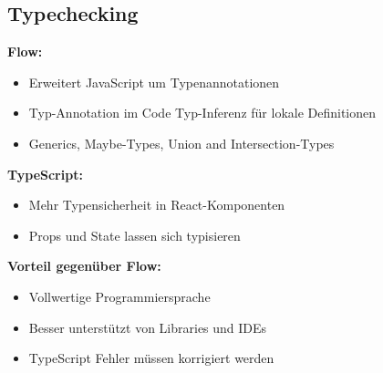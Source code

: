 \subsection{Typechecking}
\textcolor{b}{\textbf{Flow:}}
\begin{itemize}[topsep=0pt, leftmargin=3mm]
  \setlength\itemsep{-0.3em}
  \item Erweitert JavaScript um Typenannotationen
  \item Typ-Annotation im Code Typ-Inferenz für lokale Definitionen
  \item Generics, Maybe-Types, Union and Intersection-Types
\end{itemize}
\textcolor{b}{\textbf{TypeScript:}}
\begin{itemize}[topsep=0pt, leftmargin=3mm]
  \setlength\itemsep{-0.3em}
  \item Mehr Typensicherheit in React-Komponenten
  \item Props und State lassen sich typisieren
\end{itemize}
\textcolor{b}{\textbf{Vorteil gegenüber Flow:}}
\begin{itemize}[topsep=0pt, leftmargin=3mm]
  \setlength\itemsep{-0.3em}
  \item Vollwertige Programmiersprache
  \item Besser unterstützt von Libraries und IDEs
  \item TypeScript Fehler müssen korrigiert werden
\end{itemize}
